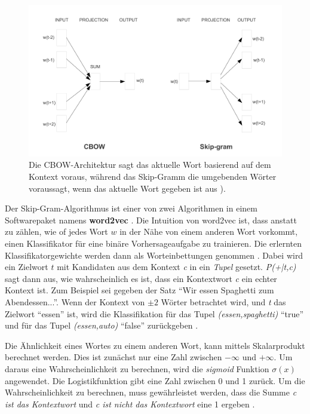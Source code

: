 \begin{figure}[H]
    \centering
    \includegraphics[width=12cm]{kapitel3/cbowskipgr.png}
    \caption[Vergleich zwischen CBOW und Skip-Gram Architektur]{Die CBOW-Architektur sagt das aktuelle Wort basierend auf dem Kontext voraus, während das Skip-Gramm die umgebenden Wörter voraussagt, wenn das aktuelle Wort gegeben ist aus \cite*{Mikolov}).}
    \label{cbowskipgr}
\end{figure}

Der Skip-Gram-Algorithmus ist einer von zwei Algorithmen in einem Softwarepaket namens \textbf{word2vec} \cite*{Mikolov2013}\cite*{Mikolov}. Die Intuition von word2vec ist, dass anstatt zu zählen, wie of jedes Wort $w$ in der Nähe von einem anderen Wort vorkommt, einen Klassifikator für eine binäre Vorhersageaufgabe zu trainieren. Die erlernten Klassifikatorgewichte werden dann als Worteinbettungen genommen \cite*[111]{Jurafskya}. Dabei wird ein Zielwort $t$ mit Kandidaten aus dem Kontext \textit{c} in ein \textit{Tupel} gesetzt. \textit{P(+|t,c)} sagt dann aus, wie wahrscheinlich es ist, dass ein Kontextwort \textit{c} ein echter Kontext ist. Zum Beispiel sei gegeben der Satz \enquote{Wir essen Spaghetti zum Abendessen...}. Wenn der Kontext von $\pm 2$ Wörter betrachtet wird, und \textit{t} das Zielwort \enquote{essen} ist, wird die Klassifikation für das Tupel \textit{(essen,spaghetti)} \enquote{true} und für das Tupel \textit{(essen,auto)} \enquote{false} zurückgeben \cite*[111]{Jurafskya}.


Die Ähnlichkeit eines Wortes zu einem anderen Wort, kann mittels Skalarprodukt berechnet werden. Dies ist zunächst nur eine Zahl zwischen $-\infty$ und $+\infty$. Um daraus eine Wahrscheinlichkeit zu berechnen, wird die \textit{sigmoid} Funktion $\sigma(x)$ angewendet. Die Logistikfunktion gibt eine Zahl zwischen 0 und 1 zurück. Um die Wahrscheinlichkeit zu berechnen, muss gewährleistet werden, dass die Summe \textit{c ist das Kontextwort} und \textit{c ist nicht das Kontextwort} eine 1 ergeben \cite*[112]{Jurafskya}.

